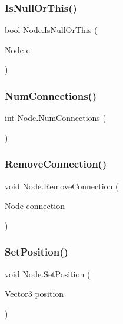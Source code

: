 \mbox{\label{class_node_a60543d6f014ce3e5d201108949bec386}} 
\subsubsection{\texorpdfstring{Is\+Null\+Or\+This()}{IsNullOrThis()}}
{\footnotesize\ttfamily bool Node.\+Is\+Null\+Or\+This (\begin{DoxyParamCaption}\item[{\mbox{\hyperlink{class_node}{Node}}}]{c }\end{DoxyParamCaption})}

\mbox{\label{class_node_a229ce68ffe988dbfd45c05b7e7cbdf2d}} 
\subsubsection{\texorpdfstring{Num\+Connections()}{NumConnections()}}
{\footnotesize\ttfamily int Node.\+Num\+Connections (\begin{DoxyParamCaption}{ }\end{DoxyParamCaption})}

\mbox{\label{class_node_ac11a8a128533ef77b42e97d883ab0825}} 
\subsubsection{\texorpdfstring{Remove\+Connection()}{RemoveConnection()}}
{\footnotesize\ttfamily void Node.\+Remove\+Connection (\begin{DoxyParamCaption}\item[{\mbox{\hyperlink{class_node}{Node}}}]{connection }\end{DoxyParamCaption})}

\mbox{\label{class_node_a42ff8a164e2432ceda0f17ab88fa47e1}} 
\subsubsection{\texorpdfstring{Set\+Position()}{SetPosition()}}
{\footnotesize\ttfamily void Node.\+Set\+Position (\begin{DoxyParamCaption}\item[{Vector3}]{position }\end{DoxyParamCaption})}



